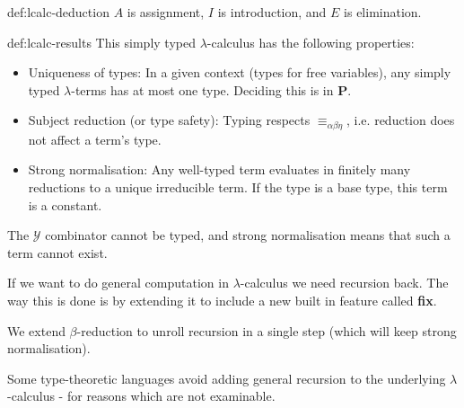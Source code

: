 \documentclass[landscape, 8pt]{extarticle}
\begin{document}
\begin{multicols}{3}
\begin{dfn}{def:lcalc-deduction}{}
$A$ is assignment, $I$ is introduction, and $E$ is elimination.
\end{dfn}

\begin{dfn}{def:lcalc-results}{}
This simply typed $\lambda$-calculus has the following properties:
\begin{itemize}
    \item Uniqueness of types: In a given context (types for free variables), any simply typed $\lambda$-terms has at most one type. Deciding this is in \textbf{P}.
    \item Subject reduction (or type safety): Typing respects $\equiv_{\alpha\beta\eta}$, i.e. reduction does not affect a term's type.
    \item Strong normalisation: Any well-typed term evaluates in finitely many reductions to a unique irreducible term. If the type is a base type, this term is a constant.
\end{itemize}

The $\mathcal{Y}$ combinator cannot be typed, and strong normalisation means that such a term cannot exist.

If we want to do general computation in $\lambda$-calculus we need recursion back. The way this is done is by extending it to include a new built in feature called \textbf{fix}.

We extend $\beta$-reduction to unroll recursion in a single step (which will keep strong normalisation). 

Some type-theoretic languages avoid adding general recursion to the underlying $\lambda$-calculus - for reasons which are not examinable.
\end{dfn}














\end{multicols}
\end{document}
